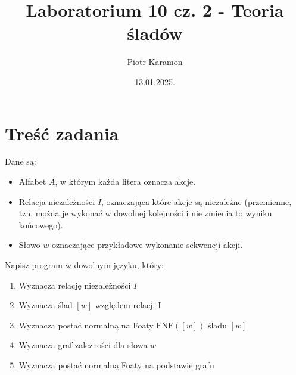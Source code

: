 \documentclass[11pt]{article}
\author{Piotr Karamon}
\date{13.01.2025.}
\title{Laboratorium 10 cz. 2 - Teoria śladów}
\begin{document}
\maketitle
\section*{Treść zadania}
\label{sec:orgf97f338}
Dane są:
\begin{itemize}
\item Alfabet \(A\), w którym każda litera oznacza akcje.
\item Relacja niezależności \(I\), oznaczająca które akcje są niezależne (przemienne,
tzn. można je wykonać w dowolnej kolejności i nie zmienia to wyniku końcowego).
\item Słowo \(w\) oznaczające przykładowe wykonanie sekwencji akcji.
\end{itemize}



Napisz program w dowolnym języku, który:
\begin{enumerate}
\item Wyznacza relację niezależności \(I\)
\item Wyznacza ślad \([w]\) względem relacji I
\item Wyznacza postać normalną na Foaty \(\text{FNF}([w])\) śladu \([w]\)
\item Wyznacza graf zależności dla słowa \(w\)
\item Wyznacza postać normalną Foaty na podstawie grafu
\end{enumerate}
\end{document}
